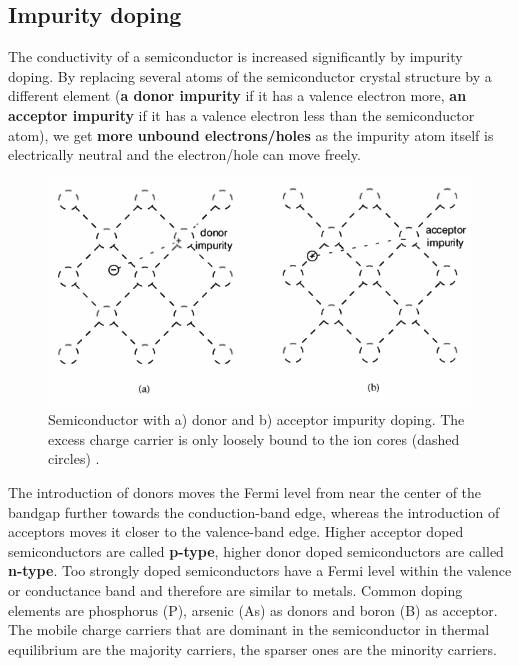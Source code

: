 \documentclass[main]{subfiles}
\begin{document}
\subsection{Impurity doping}

The conductivity of a semiconductor is increased significantly by impurity doping. By replacing several atoms of the semiconductor crystal structure by a different element (\textbf{a donor impurity} if it has a valence electron more, \textbf{an acceptor impurity} if it has a valence electron less than the semiconductor atom), we get \textbf{more unbound electrons/holes} as the impurity atom itself is electrically neutral and the electron/hole can move freely.

\begin{figure}[H]
\centering
\includegraphics[scale=0.4]{figs/impurity_doping.png}
\caption{Semiconductor with a) donor and b) acceptor impurity doping. The excess charge carrier is only loosely bound to the ion cores (dashed circles) \cite{book:VLSI}.}
\end{figure}

The introduction of donors moves the Fermi level from near the center of the bandgap further towards the conduction-band edge, whereas the
introduction of acceptors moves it closer to the valence-band edge. Higher acceptor doped semiconductors are called \textbf{p-type}, higher donor doped semiconductors are called \textbf{n-type}. Too strongly doped semiconductors have a Fermi level within the valence or conductance band and therefore are similar to metals. Common doping elements are phosphorus (P), arsenic (As) as donors and boron (B) as acceptor.\\
The mobile charge carriers that are dominant in the semiconductor in thermal equilibrium are the majority carriers, the sparser ones are the minority carriers.
\end{document}
